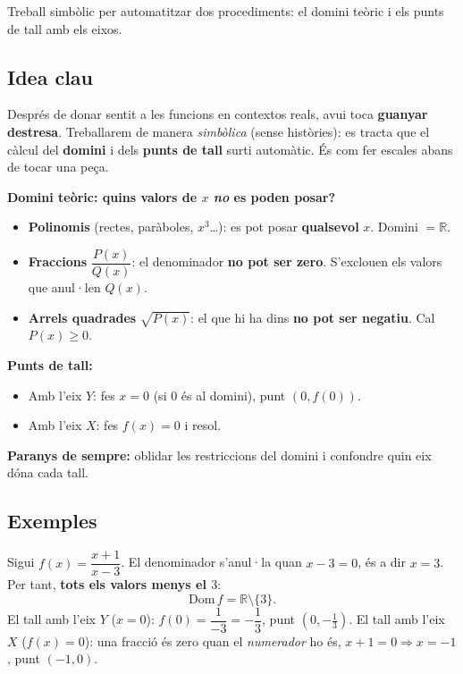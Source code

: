 %
{Treball simbòlic per automatitzar dos procediments: el domini teòric i els punts de tall amb els eixos.}

\subsection{Idea clau}

Després de donar sentit a les funcions en contextos reals, avui toca
\textbf{guanyar destresa}. Treballarem de manera \emph{simbòlica} (sense
històries): es tracta que el càlcul del \textbf{domini} i dels \textbf{punts de
tall} surti automàtic. És com fer escales abans de tocar una peça.

\begin{idea}
\textbf{Domini teòric: quins valors de $x$ \emph{no} es poden posar?}
\begin{itemize}[leftmargin=1.4em, itemsep=2pt]
  \item \textbf{Polinomis} (rectes, paràboles, $x^3$\dots): es pot posar
        \textbf{qualsevol} $x$. Domini $=\mathbb{R}$.
  \item \textbf{Fraccions} $\dfrac{P(x)}{Q(x)}$: el denominador \textbf{no pot ser
        zero}. S'exclouen els valors que anul·len $Q(x)$.
  \item \textbf{Arrels quadrades} $\sqrt{P(x)}$: el que hi ha dins \textbf{no pot ser
        negatiu}. Cal $P(x)\ge 0$.
\end{itemize}
\textbf{Punts de tall:}
\begin{itemize}[leftmargin=1.4em, itemsep=2pt]
  \item Amb l'eix $Y$: fes $x=0$ (si $0$ és al domini), punt $(0,f(0))$.
  \item Amb l'eix $X$: fes $f(x)=0$ i resol.
\end{itemize}
\textbf{Paranys de sempre:} oblidar les restriccions del domini i confondre quin eix
dóna cada tall.
\end{idea}

\subsection{Exemples}

\begin{exemple}
Sigui $f(x)=\dfrac{x+1}{x-3}$. El denominador s'anul·la quan $x-3=0$, és a dir
$x=3$. Per tant, \textbf{tots els valors menys el $3$}:
\[
\mathrm{Dom}\,f=\mathbb{R}\setminus\{3\}.
\]
El tall amb l'eix $Y$ ($x=0$): $f(0)=\dfrac{1}{-3}=-\dfrac{1}{3}$, punt
$\left(0,-\tfrac{1}{3}\right)$. El tall amb l'eix $X$ ($f(x)=0$): una fracció és
zero quan el \emph{numerador} ho és, $x+1=0 \Rightarrow x=-1$, punt $(-1,0)$.
\end{exemple}

